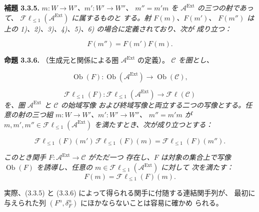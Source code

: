 \clearpage
{}%
\begingroup\small\setlength{\parskip}{0pt}\setlength{\emergencystretch}{1.5em}
\setlength{\abovedisplayskip}{4pt plus 2pt minus 2pt}%
\setlength{\belowdisplayskip}{4pt plus 2pt minus 2pt}%

\medskip\noindent\textbf{補題 3.3.5.}\quad
\textit{$m\colon W\longrightarrow W'$、$m'\colon W'\longrightarrow W''$、
$m''=m'm$ を $\mathcal A^{\operatorname{Ext}}$ の三つの射であって、
$\mathcal F\ell_{\leq 1}(\mathcal A^{\operatorname{Ext}})$ に属するものと
する。射 $F(m)$、$F(m')$、
$F(m'')$ は上の 1)、2)、3)、4)、5)、6) の場合に定義されており、次が
成り立つ：}

\begin{equation}
F(m'')=F(m')F(m).
\tag{3.3.5.1}
\end{equation}

\medskip\noindent\textbf{命題 3.3.6.}\quad
（生成元と関係による圏 $\mathcal A^{\operatorname{Ext}}$ の定義）。
\textit{$\mathcal C$ を圏とし、}

\[
\operatorname{Ob}(F)\colon
\operatorname{Ob}(\mathcal A^{\operatorname{Ext}})
\longrightarrow \operatorname{Ob}(\mathcal C),
\]

\[
\mathcal F\ell_{\leq 1}(F)\colon
\mathcal F\ell_{\leq 1}(\mathcal A^{\operatorname{Ext}})
\longrightarrow \mathcal F\ell(\mathcal C)
\]
\textit{を、圏 $\mathcal A^{\operatorname{Ext}}$ と $\mathcal C$ の始域写像
および終域写像と両立する二つの写像とする。任意の射の三つ組
$m\colon W\longrightarrow W'$、$m'\colon W'\longrightarrow W''$、
$m''=m'm$ が
$m,m',m''\in\mathcal F\ell_{\leq 1}(\mathcal A^{\operatorname{Ext}})$
を満たすとき、次が成り立つとする：}

\[
\mathcal F\ell_{\leq 1}(F)(m')\,
\mathcal F\ell_{\leq 1}(F)(m)
=\mathcal F\ell_{\leq 1}(F)(m'').
\]

\textit{このとき関手
$F\colon\mathcal A^{\operatorname{Ext}}\longrightarrow\mathcal C$ がただ一つ
存在し、$F$ は対象の集合上で写像 $\operatorname{Ob}(F)$ を誘導し、任意の
$m\in\mathcal F\ell_{\leq 1}(\mathcal A^{\operatorname{Ext}})$ に対して
次を満たす：}
\[
F(m)=\mathcal F\ell_{\leq 1}(F)(m).
\]

実際、(3.3.5) と (3.3.6) によって得られる関手に付随する連結関手列が、
最初に与えられた列 $(F^n,\delta_F^n)$ にほかならないことは容易に確かめ
られる。

